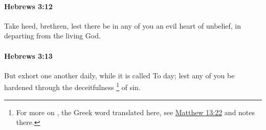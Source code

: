 		\paragraph{Hebrews 3:12} %
			\label{HEBREWS-3-12}

			Take heed, brethren, lest there be in any of you an evil heart of unbelief, in departing from the living God.

			\begin{framed}
			\scriptsize
				\begin{compactdesc}
					\item[SBLG] 
				\end{compactdesc}
			\end{framed}

		\paragraph{Hebrews 3:13} %
			\label{HEBREWS-3-13}

			But exhort one another daily, while it is called To day; lest any of you be hardened through the deceitfulness%
				\footnote{%
					For more on , the Greek word translated here, see \hyperref[MATTHEW-13-22]{Matthew 13:22} and notes there.
					}
			of sin.

